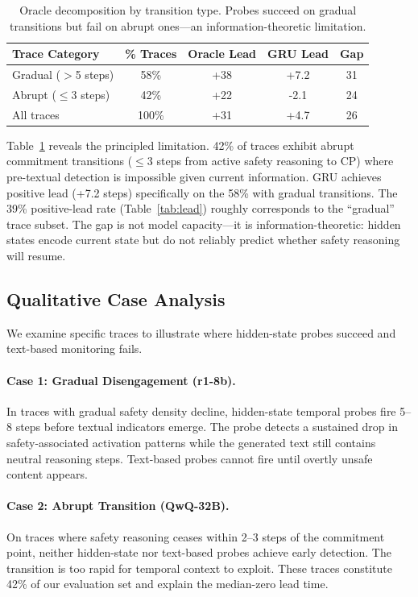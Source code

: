 \documentclass[11pt,a4paper]{article}
\begin{document}
\begin{table}[t]
\centering
\small
\begin{tabular}{lcccc}
\toprule
Trace Category & \% Traces & Oracle Lead & GRU Lead & Gap \\
\midrule
Gradual ($>$5 steps) & 58\% & +38 & +7.2 & 31 \\
Abrupt ($\leq$3 steps) & 42\% & +22 & -2.1 & 24 \\
All traces & 100\% & +31 & +4.7 & 26 \\
\bottomrule
\end{tabular}
\caption{Oracle decomposition by transition type. Probes succeed on gradual transitions but fail on abrupt ones---an information-theoretic limitation.}
\label{tab:oracle}
\end{table}

Table~\ref{tab:oracle} reveals the principled limitation. 42\% of traces exhibit abrupt commitment transitions ($\leq$3 steps from active safety reasoning to CP) where pre-textual detection is impossible given current information. GRU achieves positive lead (+7.2 steps) specifically on the 58\% with gradual transitions. The 39\% positive-lead rate (Table~\ref{tab:lead}) roughly corresponds to the ``gradual'' trace subset. The gap is not model capacity---it is information-theoretic: hidden states encode current state but do not reliably predict whether safety reasoning will resume.

\subsection{Qualitative Case Analysis}

We examine specific traces to illustrate where hidden-state probes succeed and text-based monitoring fails.

\paragraph{Case 1: Gradual Disengagement (r1-8b).} In traces with gradual safety density decline, hidden-state temporal probes fire 5--8 steps before textual indicators emerge. The probe detects a sustained drop in safety-associated activation patterns while the generated text still contains neutral reasoning steps. Text-based probes cannot fire until overtly unsafe content appears.

\paragraph{Case 2: Abrupt Transition (QwQ-32B).} On traces where safety reasoning ceases within 2--3 steps of the commitment point, neither hidden-state nor text-based probes achieve early detection. The transition is too rapid for temporal context to exploit. These traces constitute 42\% of our evaluation set and explain the median-zero lead time.
\end{document}
